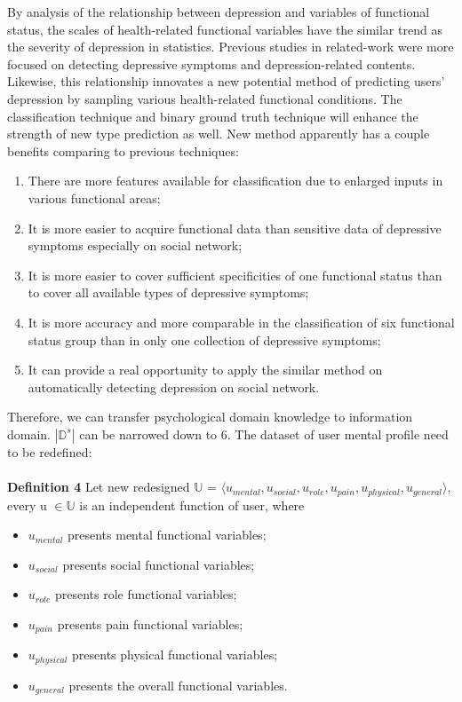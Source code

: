 \documentclass[runningheads]{llncs}
\begin{document}
By analysis of the relationship between depression and variables of functional status, the scales of health-related functional variables have the similar trend as the severity of depression in statistics. Previous studies in related-work were more focused on detecting depressive symptoms and depression-related contents. Likewise, this relationship innovates a new potential method of predicting users' depression by sampling various health-related functional conditions. The classification technique and binary ground truth technique will enhance the strength of new type prediction as well. New method apparently has a couple benefits comparing to previous techniques:
\begin{enumerate}[label=\alph*)]
  \item There are more features available for classification due to enlarged inputs in various functional areas;
  \item It is more easier to acquire functional data than sensitive data of depressive symptoms especially on social network; 
  \item It is more easier to cover sufficient specificities of one functional status than to cover all available types of depressive symptoms;
  \item It is more accuracy and more comparable in the classification of six functional status group than in only one collection of depressive symptoms;
  \item It can provide a real opportunity to apply the similar method on automatically detecting depression on social network.
\end{enumerate}

Therefore, we can transfer psychological domain knowledge to information domain. \textit{$|\mathbb{D}^s|$} can be narrowed down to 6. The dataset of user mental profile need to be redefined:\\
\\
\textbf{Definition 4} Let new redesigned $\mathbb{U}$ = $\langle u_{mental}, u_{social}, u_{role}, u_{pain}, u_{physical}, u_{general} \rangle$, every u  $\in \mathbb{U}$ is an independent function of user, where
\begin{itemize}
  \item $u_{mental}$ presents mental functional variables;
  \item $u_{social}$ presents social functional variables;
  \item $u_{role}$ presents role functional variables;
  \item $u_{pain}$ presents pain functional variables;
  \item $u_{physical}$ presents physical functional variables;
  \item $u_{general}$ presents the overall functional variables.
\end{itemize}
%
%
\end{document}
